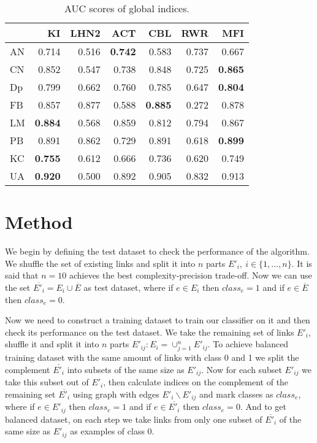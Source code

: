 \documentclass{llncs}
\begin{document}
\begin{table}
\begin{center}
\caption{AUC scores of global indices.}
\begin{tabular}{l|rrrrrr}
{} &     KI &   LHN2 &    ACT &    CBL &    RWR &    MFI \\ \hline
AN &  0.714 &  0.516 &  \textbf{0.742} &  0.583 &  0.737 &  0.667 \\
CN &  0.852 &  0.547 &  0.738 &  0.848 &  0.725 &  \textbf{0.865} \\
Dp &  0.799 &  0.662 &  0.760 &  0.785 &  0.647 &  \textbf{0.804} \\
FB &  0.857 &  0.877 &  0.588 &  \textbf{0.885} &  0.272 &  0.878 \\
LM &  \textbf{0.884} &  0.568 &  0.859 &  0.812 &  0.794 &  0.867 \\
PB &  0.891 &  0.862 &  0.729 &  0.891 &  0.618 &  \textbf{0.899} \\
KC &  \textbf{0.755} &  0.612 &  0.666 &  0.736 &  0.620 &  0.749 \\
UA &  \textbf{0.920} &  0.500 &  0.892 &  0.905 &  0.832 &  0.913 \\
\end{tabular}
\end{center}
\end{table}
%
\section{Method}
%
We begin by defining the test dataset to check the performance of the algorithm. We shuffle the set of existing links and split it into $n$ parts $E'_i, \ i \in \{1, \ldots, n\}$. It is said that $n = 10$ achieves the best complexity-precision trade-off. Now we can use the set $\overline{E'_i} = E_i \cup \overline{E}$ as test dataset, where if $e \in E_i$ then $class_e = 1$ and if $e \in \overline{E}$ then $class_e = 0$.

Now we need to construct a training dataset to train our classifier on it and then check its performance on the test dataset. We take the remaining set of links $E'_i$, shuffle it and split it into $n$ parts $E'_{ij} : E_i = \cup_{j = 1}^{n} E'_{ij}$. To achieve balanced training dataset with the same amount of links with class 0 and 1 we split the complement $\bar{E'_i}$ into subsets of the same size as $E'_{ij}$. Now for each subset $E'_{ij}$ we take this subset out of $E'_i$, then calculate indices on the complement of the remaining set $\overline{E'_i}$ using graph with edges $E'_i \backslash E'_{ij}$ and mark classes as $class_e$, where if $e \in E'_{ij}$ then $class_e = 1$ and if $e \in \overline{E'_i}$ then $class_e = 0$. And to get balanced dataset, on each step we take links from only one subset of $\overline{E'_i}$ of the same size as $E'_{ij}$ as examples of class 0.
\end{document}
